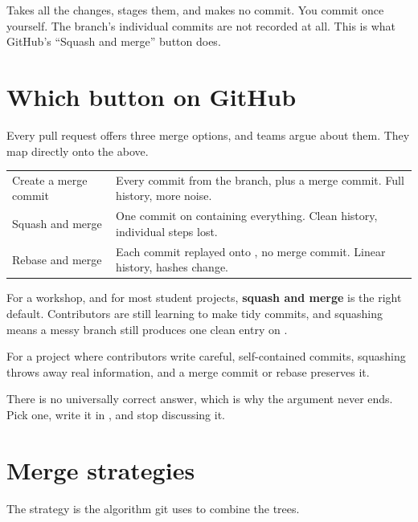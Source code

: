 \documentclass[11pt]{article}
\begin{document}
Takes all the changes, stages them, and makes no commit. You commit once yourself.
The branch's individual commits are not recorded at all. This is what GitHub's
``Squash and merge'' button does.

\section{Which button on GitHub}

Every pull request offers three merge options, and teams argue about them. They map
directly onto the above.

\vspace{0.5em}
\begin{tabularx}{\linewidth}{@{}L{3.4cm} X@{}}
\toprule
{} &  \\
\midrule
Create a merge commit & Every commit from the branch, plus a merge commit. Full
history, more noise. \\
Squash and merge & One commit on  containing everything. Clean history,
individual steps lost. \\
Rebase and merge & Each commit replayed onto , no merge commit. Linear
history, hashes change. \\
\bottomrule
\end{tabularx}
\vspace{0.5em}

\begin{note}
For a workshop, and for most student projects, \textbf{squash and merge} is the
right default. Contributors are still learning to make tidy commits, and squashing
means a messy branch still produces one clean entry on .

For a project where contributors write careful, self-contained commits, squashing
throws away real information, and a merge commit or rebase preserves it.

There is no universally correct answer, which is why the argument never ends. Pick
one, write it in , and stop discussing it.
\end{note}

\section{Merge strategies}

The strategy is the algorithm git uses to combine the trees.
\end{document}
